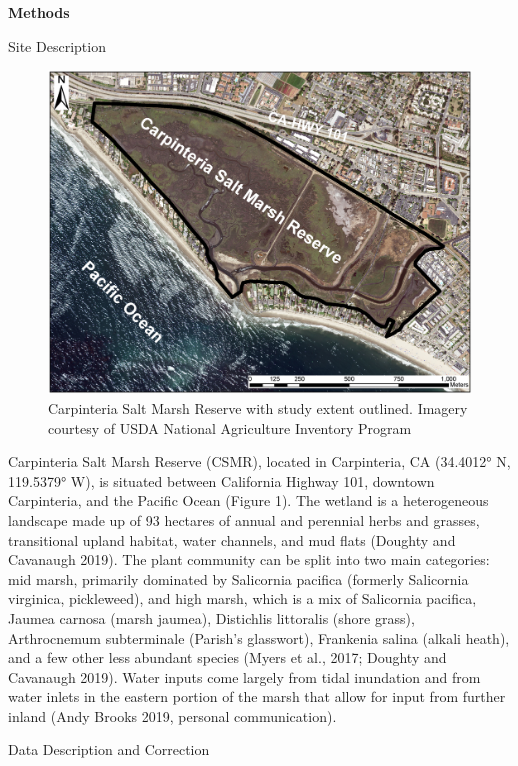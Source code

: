 \documentclass[
]{article}
\begin{document}
\textbf{Methods}

Site Description

\begin{figure}
\centering
\includegraphics{Fig1.eps}
\caption{Carpinteria Salt Marsh Reserve with study extent outlined.
Imagery courtesy of USDA National Agriculture Inventory Program}
\end{figure}

Carpinteria Salt Marsh Reserve (CSMR), located in Carpinteria, CA
(34.4012° N, 119.5379° W), is situated between California Highway 101,
downtown Carpinteria, and the Pacific Ocean (Figure 1). The wetland is a
heterogeneous landscape made up of 93 hectares of annual and perennial
herbs and grasses, transitional upland habitat, water channels, and mud
flats (Doughty and Cavanaugh 2019). The plant community can be split
into two main categories: mid marsh, primarily dominated by Salicornia
pacifica (formerly Salicornia virginica, pickleweed), and high marsh,
which is a mix of Salicornia pacifica, Jaumea carnosa (marsh jaumea),
Distichlis littoralis (shore grass), Arthrocnemum subterminale (Parish's
glasswort), Frankenia salina (alkali heath), and a few other less
abundant species (Myers et al., 2017; Doughty and Cavanaugh 2019). Water
inputs come largely from tidal inundation and from water inlets in the
eastern portion of the marsh that allow for input from further inland
(Andy Brooks 2019, personal communication).

Data Description and Correction
\end{document}
